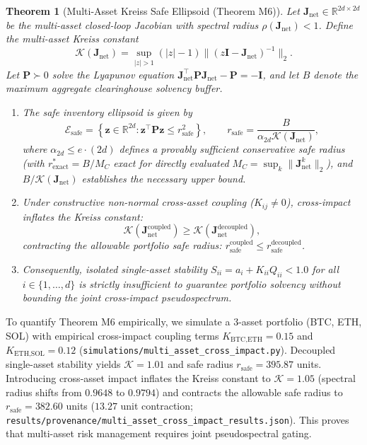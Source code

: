 \documentclass[10pt,twocolumn,letterpaper]{article}
\newtheorem{theorem}{Theorem}[section]
\theoremstyle{definition}
\theoremstyle{remark}
\begin{document}
\begin{theorem}[Multi-Asset Kreiss Safe Ellipsoid (Theorem M6)]
\label{thm:multi_asset_kreiss}
Let $\mathbf{J}_{\text{net}} \in \mathbb{R}^{2d \times 2d}$ be the multi-asset closed-loop Jacobian with spectral radius $\rho(\mathbf{J}_{\text{net}}) < 1$. Define the multi-asset Kreiss constant
\begin{equation}
\mathcal{K}(\mathbf{J}_{\text{net}}) = \sup_{|z| > 1} (|z| - 1) \|(z\mathbf{I} - \mathbf{J}_{\text{net}})^{-1}\|_2.
\end{equation}
Let $\mathbf{P} \succ 0$ solve the Lyapunov equation $\mathbf{J}_{\text{net}}^\top \mathbf{P} \mathbf{J}_{\text{net}} - \mathbf{P} = -\mathbf{I}$, and let $B$ denote the maximum aggregate clearinghouse solvency buffer. 
\begin{enumerate}
    \item The safe inventory ellipsoid is given by
    \begin{equation}
    \mathcal{E}_{\text{safe}} = \left\{ \mathbf{z} \in \mathbb{R}^{2d} : \mathbf{z}^\top \mathbf{P} \mathbf{z} \le r_{\text{safe}}^2 \right\}, \qquad r_{\text{safe}} = \frac{B}{\alpha_{2d} \mathcal{K}(\mathbf{J}_{\text{net}})},
    \end{equation}
    where $\alpha_{2d} \le e \cdot (2d)$ defines a provably sufficient conservative safe radius (with $r^*_{\text{exact}} = B / M_C$ exact for directly evaluated $M_C = \sup_k \|\mathbf{J}_{\text{net}}^k\|_2$), and $B / \mathcal{K}(\mathbf{J}_{\text{net}})$ establishes the necessary upper bound.
    \item Under constructive non-normal cross-asset coupling ($K_{ij} \ne 0$), cross-impact inflates the Kreiss constant:
    \begin{equation}
    \mathcal{K}(\mathbf{J}_{\text{net}}^{\text{coupled}}) \ge \mathcal{K}(\mathbf{J}_{\text{net}}^{\text{decoupled}}),
    \end{equation}
    contracting the allowable portfolio safe radius: $r_{\text{safe}}^{\text{coupled}} \le r_{\text{safe}}^{\text{decoupled}}$.
    \item Consequently, isolated single-asset stability $S_{ii} = a_i + K_{ii}Q_{ii} < 1.0$ for all $i \in \{1, \dots, d\}$ is strictly insufficient to guarantee portfolio solvency without bounding the joint cross-impact pseudospectrum.
\end{enumerate}
\end{theorem}

To quantify Theorem M6 empirically, we simulate a 3-asset portfolio (BTC, ETH, SOL) with empirical cross-impact coupling terms $K_{\text{BTC,ETH}} = 0.15$ and $K_{\text{ETH,SOL}} = 0.12$ (\texttt{simulations/multi\_asset\_cross\_impact.py}). Decoupled single-asset stability yields $\mathcal{K} = 1.01$ and safe radius $r_{\text{safe}} = 395.87$ units. Introducing cross-asset impact inflates the Kreiss constant to $\mathcal{K} = 1.05$ (spectral radius shifts from $0.9648$ to $0.9794$) and contracts the allowable safe radius to $r_{\text{safe}} = 382.60$ units ($13.27$ unit contraction; \texttt{results/provenance/multi\_asset\_cross\_impact\_results.json}). This proves that multi-asset risk management requires joint pseudospectral gating.
\end{document}
